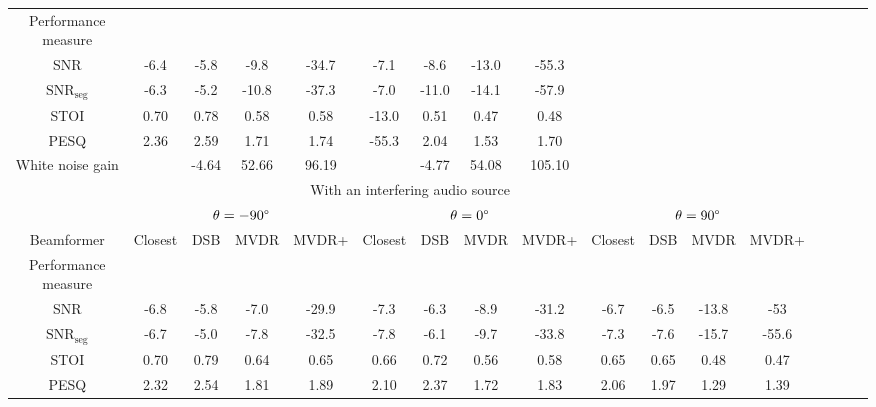 \begin{sidewaystable}[h]
\begin{adjustbox}{max width=\textwidth}
\begin{tabular}{|c|c|c|c|c|c|c|c|c|c|c|c|c|c|c|c|c|}
Performance measure 	&  			&  		&  		&  				&  			&  		&  			&  			\\
	
SNR 					& -6.4 		& -5.8 	& -9.8 	& -34.7 		& -7.1 		& -8.6 	& -13.0 	& -55.3 	\\
									
$\text{SNR}_\text{seg}$	& -6.3 		& -5.2 	& -10.8 & -37.3 		& -7.0 		& -11.0 & -14.1 	& -57.9 	\\
			
STOI    				& 0.70 		& 0.78 	& 0.58 	& 0.58 			& -13.0 	& 0.51 	& 0.47 		& 0.48 		\\
										
PESQ  					& 2.36 		& 2.59 	& 1.71 	& 1.74 			& -55.3 	& 2.04 	& 1.53 		& 1.70 		\\
	
White noise gain 		&  			& -4.64 & 52.66 & 96.19 		&  			& -4.77 & 54.08 	& 105.10 	\\

\hline \hline 
\multicolumn{13}{|c|}{\multirow{2}{*}{With an interfering audio source}} \\ 
\multicolumn{13}{|l|}{} \\ \hline

						& \multicolumn{4}{c|}{$\theta = -90\degree$} 	& \multicolumn{4}{c|}{$\theta = 0\degree$} 	& \multicolumn{4}{c|}{$\theta = 90\degree$} \\ \hline

Beamformer				& Closest  	& DSB 	& MVDR 	& MVDR+ 		& Closest  	& DSB 	& MVDR 	& MVDR+ 		& Closest  	& DSB 	& MVDR 	& MVDR+  \\ \hline

Performance measure 	& 			& 		&  		&  				&  			&  		&  		&  				&	  		&  		&  		& \\ 

SNR 					& -6.8 & -5.8 & -7.0 & -29.9 & -7.3 & -6.3 & -8.9 & -31.2 & -6.7	& -6.5	& -13.8 & -53 \\ 

$\text{SNR}_\text{seg}$	& -6.7 & -5.0 & -7.8 & -32.5 & -7.8 & -6.1 & -9.7 & -33.8 & -7.3	& -7.6	& -15.7 & -55.6 \\

STOI    				& 0.70 & 0.79 & 0.64 & 0.65 & 0.66 & 0.72 & 0.56 & 0.58 & 0.65	& 0.65	& 0.48 & 0.47 	\\

PESQ  					& 2.32 & 2.54 & 1.81 & 1.89 & 2.10 & 2.37 & 1.72 & 1.83 & 2.06	& 1.97	& 1.29 & 1.39 	\\


\end{tabular}
\end{adjustbox}
\end{sidewaystable}
